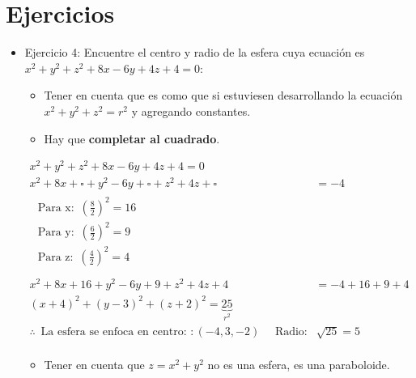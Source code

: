 \section{Ejercicios}
\begin{itemize}
    \item  Ejercicio 4: Encuentre el centro y radio de la esfera cuya ecuación es $x^2+y^2+z^2+8x-6y+4z+4=0$:
        \begin{itemize}
            \item Tener en cuenta que es como que si estuviesen desarrollando la ecuación $x^2+y^2+z^2=r^2$ y agregando constantes.
            \item Hay que \textbf{completar al cuadrado}.
        \end{itemize}

        \begin{center}
            \begin{align*}
                x^2+y^2+z^2+8x-6y+4z+4=0 \\ 
                x^2+8x+\square+y^2-6y+\square+z^2+4z+\square&=-4 \\ 
                \begin{matrix}
                    \text{  Para x:  }\, \left(\frac{8}{2}\right)^2 = 16 \\ 
                    \text{  Para y:  }\, \left( \frac{6}{2}  \right)^2 = 9 \\ 
                    \text{  Para z:  }\, \left(\frac{4}{2}\right)^2 = 4 \\ 
                \end{matrix} \\ 
                x^2+8x+16+y^2-6y+9+z^2+4z+4&= -4 +16+9+4\\
                (x+4)^2+(y-3)^2+(z+2)^2= \underbrace{25}_{r^2} \\ 
                \therefore \, \text{  La esfera se enfoca en centro:  }: (-4,3,-2) \quad \text{  Radio:  } \, \sqrt[]{25}=5 \\ 
            \end{align*}
        \end{center}
        
        \begin{itemize}
            \item Tener en cuenta que $z=x^2+y^2$ no es una esfera, es una paraboloide.
        \end{itemize}
    

\end{itemize}
